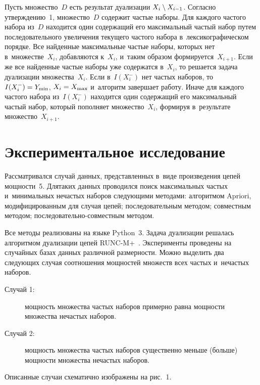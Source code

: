 \begin{multicols}{2}
    Пусть множество~$D$ есть результат дуализации $X_{i} \hm\setminus X_{i-1}$. Согласно утверждению~1, 
    множество~$D$ содержит частые наборы. Для каждого час\-то\-го набора из~$D$ 
    находится один содержащий его максимальный час\-тый набор путем последовательного 
    увеличения текущего час\-то\-го набора в~лексикографическом порядке. Все найденные максимальные
     частые наборы, которых нет в~множестве~$X_{i}$, до\-бав\-ля\-ют\-ся к~$X_{i}$, 
     и~таким образом формируется~$X_{i+1}$. Если же все найденные частые наборы уже содержатся в~$X_{i}$, 
     то решается задача дуализации множества~$X_{i}$. Если в~$I(X^{-}_{i})$ нет частых наборов, 
     то $I(X^{-}_{i})\hm = Y_{\min}$, $X_i \hm= X_{\max}$ и~алгоритм завершает работу. 
     Иначе для каждого частого набора из~$I(X^{-}_{i})$ находится один содержащий его максимальный 
     час\-тый набор, который пополняет множество~$X_{i}$, формируя в~результате множество~$X_{i+1}$.

    \section{Экспериментальное исследование}
    
    Рас\-смат\-ри\-вал\-ся случай данных, пред\-став\-лен\-ных в~виде произведения цепей мощ\-ности~5. 
    Для\linebreak таких данных проводился поиск максимальных час\-тых и~минимальных нечастых 
    наборов сле\-ду\-ющи\-ми методами: алгоритмом Apriori, модифицированным для случая 
    цепей; последовательным \mbox{методом}; совместным методом; по\-сле\-до\-ва\-тель\-но-со\-вмест\-ным методом.
    
    Все методы реализованы на языке Python~3. 
    Задача дуализации решалась алгоритмом дуализации цепей RUNC-M+~\cite{7}. 
    Эксперименты проведены на случайных базах данных различной раз\-мер\-ности. 
    Можно выделить два сле\-ду\-ющих случая соотношения мощностей множеств всех час\-тых и~не\-час\-тых наборов.
    \begin{description}
    \item[Случай 1:] мощ\-ность множества частых наборов примерно рав\-на мощ\-ности множества нечастых наборов.
    \item[Случай 2:] мощ\-ность множества частых наборов существенно меньше (больше) мощ\-ности множества 
    не\-час\-тых наборов.
    \end{description}
    
    Описанные случаи схематично изображены на рис.~1. 


\end{multicols}
